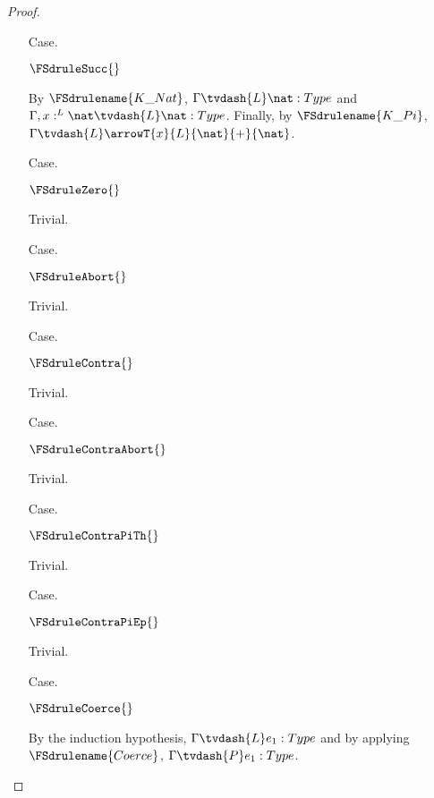 \begin{proof}
\begin{itemize}
  \item[Case.] \ \\
    \begin{center}
      $\FSdruleSucc{}$
    \end{center}
    By $\FSdrulename{K\_Nat}$, $\Gamma \tvdash{L} \nat:Type$ and 
    $\Gamma,x:^L \nat \tvdash{L} \nat:Type$.  Finally, by $\FSdrulename{K\_Pi}$,
    $\Gamma \tvdash{L} \arrowT{x}{L}{\nat}{+}{\nat}$.
    
    
  \item[Case.] \ \\
    \begin{center}
      $\FSdruleZero{}$
    \end{center}
    Trivial.

  \item[Case.] \ \\
    \begin{center}
      $\FSdruleAbort{}$  
    \end{center}
    Trivial.

  \item[Case.] \ \\
    \begin{center}
      $\FSdruleContra{}$
    \end{center}
    Trivial.

  \item[Case.] \ \\
    \begin{center}
      $\FSdruleContraAbort{}$
    \end{center}
    Trivial.

  \item[Case.] \ \\
    \begin{center}
      $\FSdruleContraPiTh{}$
    \end{center}
    Trivial.

  \item[Case.] \ \\
    \begin{center}
      $\FSdruleContraPiEp{}$
    \end{center}
    Trivial.

  \item[Case.] \ \\
    \begin{center}
      $\FSdruleCoerce{}$
    \end{center}
    By the induction hypothesis, $\Gamma \tvdash{L} e_1:Type$ and by applying 
    $\FSdrulename{Coerce}$, $\Gamma \tvdash{P} e_1:Type$.


\end{itemize}
\end{proof}
